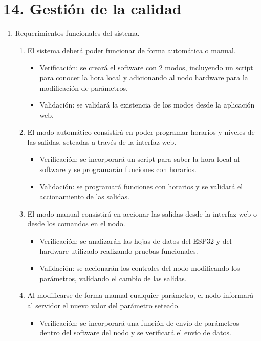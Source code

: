 \documentclass[
11pt, %
]{charter}
\begin{document}
\section{14. Gestión de la calidad}
\label{sec:calidad}

\begin{enumerate}
	\item Requerimientos funcionales del sistema.
		\begin{enumerate}
			\item El sistema deberá poder funcionar de forma automática o manual.
			\begin{itemize}
				\item Verificación: se creará el software con 2 modos, incluyendo un script para conocer la hora local y adicionando al nodo hardware para la modificación de parámetros.
				\item Validación: se validará la existencia de los modos desde la aplicación web.
			\end{itemize}
			\item El modo automático consistirá en poder programar horarios y niveles de las salidas, seteadas a través de la interfaz web.
			\begin{itemize}
				\item Verificación: se incorporará un script para saber la hora local al software y se programarán funciones con horarios.
				\item Validación: se programará funciones con horarios y se validará el accionamiento de las salidas.
			\end{itemize}
			\item El modo manual consistirá en accionar las salidas desde la interfaz web o desde los comandos en el nodo.
			\begin{itemize}
				\item Verificación: se analizarán las hojas de datos del ESP32 y del hardware utilizado realizando pruebas funcionales.
				\item Validación: se accionarán los controles del nodo modificando los parámetros, validando el cambio de las salidas.
			\end{itemize}
			\item Al modificarse de forma manual cualquier parámetro, el nodo informará al servidor el nuevo valor del parámetro seteado.
			\begin{itemize}
				\item Verificación: se incorporará una función de envío de parámetros dentro del software del nodo y se verificará el envío de datos.

\end{itemize}
\end{enumerate}
\end{enumerate}
\end{document}
